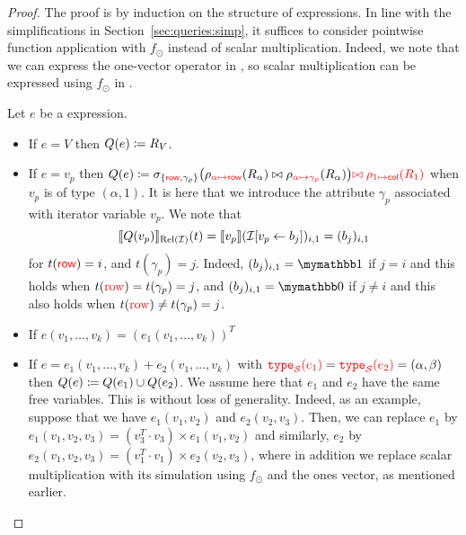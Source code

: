 \begin{proof}
The proof is by induction on the structure of \langsum expressions. In line with the simplifications in Section~\ref{sec:queries:simp}, it suffices to consider pointwise function application with $f_\odot$ instead of scalar multiplication. Indeed, we note that we can express the one-vector operator in \langsum, so scalar multiplication can be expressed using $f_\odot$ in \langsum.

Let $e$ be a \langsum expression.
\begin{itemize}
  \item If $e=V$ then $Q (e)\coloneqq R_V$.
  \item If $e=v_p$ then $Q (e)\coloneqq \sigma_{\lbrace {\color{red} \mathsf{row}},\gamma_p\rbrace}\bigl(\rho_{{\color{red} \alpha\mapsto \mathsf{row}}}(R_\alpha)\bowtie \rho_{{\color{red} \alpha\mapsto\gamma_p}}(R_\alpha)\bigr) {\color{red} \bowtie \rho_{1\mapsto\mathsf{col}}(R_1)} $ when  $v_p$ is of type $(\alpha,1)$. It is here that we introduce the attribute $\gamma_p$ associated with iterator variable $v_p$.
 We note that 
$$ \llbracket Q(v_p) \rrbracket_{\text{Rel}(\mathcal{I})}(t)=\llbracket v_p \rrbracket(\mathcal{I}[v_p\gets b_{j}])_{i,1}=(b_j)_{i,1}
$$
for $t({\color{red} \mathsf{row}})=i$,  and $t(\gamma_p)=j$. Indeed, $(b_j)_{i,1}=\kone$ if $j=i$
and this holds when $t({\color{red} \mathrm{row}})=t(\gamma_p)=j$, and $(b_j)_{i,1}=\kzero$ if $j\neq i$
and this also holds when $t({\color{red} \mathrm{row}})\neq t(\gamma_p)=j$.

  \item If $e(v_1,\ldots,v_k)=(e_1(v_1,\ldots,v_k))^T$ %
\item If $e=e_1(v_1,\ldots,v_k)+e_2(v_1,\ldots,v_k)$ with ${\color{red} \texttt{type}_{\mathcal{S}}(e_1)}={\color{red} \texttt{type}_{\mathcal{S}}(e_2)}=(\alpha, \beta)$ then $Q (e)\coloneqq Q (e_1)\cup Q (e_2)$. We assume here that $e_1$ and $e_2$ have the same free variables. This is without loss of generality. Indeed, as an example, suppose that we have $e_1(v_1,v_2)$
and $e_2(v_2,v_3)$. Then, we can replace $e_1$ by  $e_1(v_1,v_2,v_3)=(v_3^T\cdot v_3)\times e_1(v_1,v_2)$
and similarly, $e_2$ by $e_2(v_1,v_2,v_3)=(v_1^T\cdot v_1)\times e_2(v_2,v_3)$, where in addition we replace scalar multiplication with its simulation using $f_{\odot}$ and the ones vector, as mentioned earlier. 


\end{itemize}
\end{proof}
